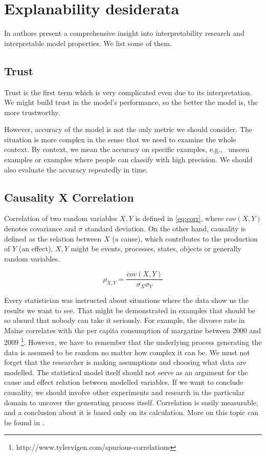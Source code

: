\section{Explanability desiderata}
In \cite{Lipton2016} authors present a comprehensive insight into interpretability research and interpretable model properties. We list some of them.

\subsection{Trust}
Trust is the first term which is very complicated even due to its interpretation. We might build trust in the model's performance, so the better the model is, the more trustworthy. 

However, accuracy of the model is not the only metric we should consider. The situation is more complex in the sense that we need to examine the whole context. By context, we mean the accuracy on specific examples, e.g., \ unseen examples or examples where people can classify with high precision. We should also evaluate the accuracy repeatedly in time.

\subsection{Causality X Correlation}
Correlation of two random variables $X,Y$ is defined in \ref{eq:corr}, where $cov(X,Y)$ denotes covariance and $\sigma$ standard deviation. On the other hand, causality is defined as the relation between $X$ (a cause), which contributes to the production of $Y$ (an effect), $X, Y$ might be events, processes, states, objects or generally random variables.

\begin{equation} \label{eq:corr}
    \rho_{X,Y}=\frac{cov(X,Y)}{\sigma_X\sigma_Y}
\end{equation}

Every statistician was instructed about situations where the data show us the results we want to see. That might be demonstrated in examples that should be so absurd that nobody can take it seriously. For example, the divorce rate in Maine correlates with the per capita consumption of margarine between 2000 and 2009 \footnote{http://www.tylervigen.com/spurious-correlations}. However, we have to remember that the underlying process generating the data is assumed to be random no matter how complex it can be. We must not forget that the researcher is making assumptions and choosing what data are modelled. The statistical model itself should not serve as an argument for the cause and effect relation between modelled variables. If we want to conclude causality, we should involve other experiments and research in the particular domain to uncover the generating process itself. Correlation is easily measurable, and a conclusion about it is based only on its calculation. More on this topic can be found in \cite{Kenny1979}.

